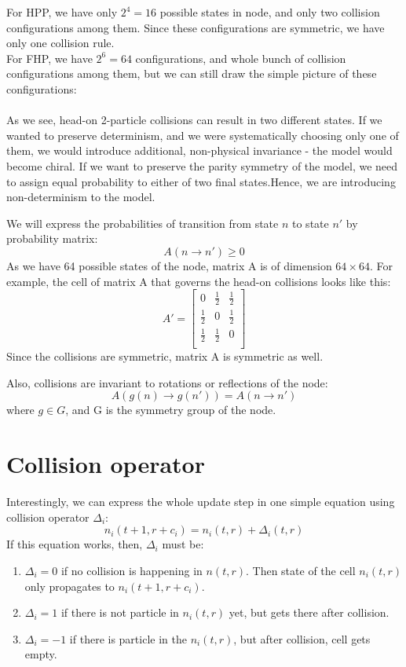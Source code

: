 For HPP, we have only $2^4 = 16$ possible states in node, and only two collision configurations among them. Since these configurations are symmetric, we have only one collision rule.\\
For FHP, we have $2^6 = 64$ configurations, and whole bunch of collision configurations among them, but we can still draw the simple picture of these configurations:\\
\\
As we see, head-on 2-particle collisions can result in two different states. If we wanted to preserve determinism, and we were systematically choosing only one of them, we would introduce additional, non-physical invariance - the model would become chiral. If we want to preserve the parity symmetry of the model, we need to assign equal probability to either of two final states.Hence, we are introducing non-determinism to the model.

We will express the probabilities of transition from state $n$ to state $n'$ by probability matrix:
\begin{equation}
A(n \rightarrow n') \geq 0
\end{equation}
As we have 64 possible states of the node, matrix A is of dimension $64\times 64$.
For example, the cell of matrix A that governs the head-on collisions looks like this:
\[
 A'=
  \begin{bmatrix}
    0 & \frac{1}{2} & \frac{1}{2} \\
    \frac{1}{2} & 0 & \frac{1}{2} \\
    \frac{1}{2} & \frac{1}{2} & 0 \\
  \end{bmatrix}
\]
Since the collisions are symmetric, matrix A is symmetric as well.

Also, collisions are invariant to rotations or reflections of the node:
\begin{equation}
A(g(n) \rightarrow g(n')) = A(n \rightarrow n')
\end{equation}
where $g \in G$, and G is the symmetry group of the node.

\section{Collision operator}
Interestingly, we can express the whole update step in one simple equation using collision operator $\Delta_i$:
\begin{equation}
n_i(t+1,r+c_i) = n_i(t,r) + \Delta_i(t,r)
\end{equation}
If this equation works, then, $\Delta_i$ must be:
\begin{enumerate}
\item $\Delta_i = 0$ if no collision is happening in $n(t,r)$. Then state of the cell $n_i(t,r)$ only propagates to $n_i(t+1,r+c_i)$.
\item $\Delta_i = 1$ if there is not particle in $n_i(t,r)$ yet, but gets there after collision. 
 \item $\Delta_i = -1$ if there is particle in the $n_i(t,r)$, but after collision, cell gets empty.
\end{enumerate}

